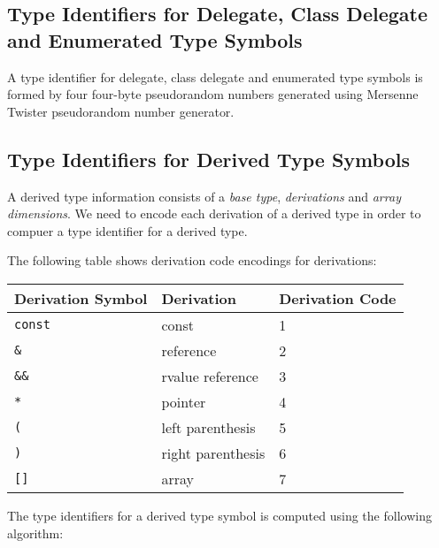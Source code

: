 \documentclass[a4paper,oneside,11pt]{book}
\theoremstyle{definition}
\begin{document}
\subsection{Type Identifiers for Delegate, Class Delegate and Enumerated Type Symbols}

A type identifier for delegate, class delegate and enumerated type symbols is formed by four
four-byte pseudorandom numbers generated using Mersenne Twister pseudorandom number generator.

\subsection{Type Identifiers for Derived Type Symbols}

A derived type information consists of a \emph{base type}, \emph{derivations} and \emph{array dimensions}.
We need to encode each derivation of a derived type in order to compuer a type identifier for a derived type.

The following table shows derivation code encodings for derivations:
\clearpage
\begin{flushleft}
\begin{supertabular}{lll}
\textbf{Derivation Symbol}& \textbf{Derivation}& \textbf{Derivation Code}\\
\hline
\verb|const|& const& 1\\
\verb|&|& reference& 2\\
\verb|&&|& rvalue reference& 3\\
\verb|*|& pointer& 4\\
\verb|(|& left parenthesis& 5\\
\verb|)|& right parenthesis& 6\\
\verb|[]|& array& 7\\
\hline
\end{supertabular}
\end{flushleft}

The type identifiers for a derived type symbol is computed using the following algorithm:
\end{document}
